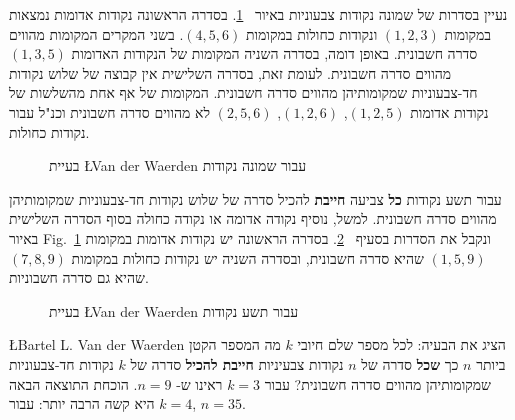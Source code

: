 נעיין בסדרות של שמונה נקודות צבעוניות באיור%
~\ref{f.vdw1}.
בסדרה הראשונה נקודות אדומות נמצאות במקומות
$(1,2,3)$
ונקודות כחולות במקומות
$(4,5,6)$.
בשני המקרים המקומות מהווים סדרה חשבונית. באופן דומה, בסדרה השניה המקומות של הנקודות האדומות
$(1,3,5)$
מהווים סדרה חשבונית. לעומת זאת, בסדרה השלישית אין קבוצה של שלוש נקודות חד-צבעוניות שמקומותיהן מהווים סדרה חשבונית. המקומות של אף אחת מהשלשות של נקודות אדומות 
$(1,2,5)$, $(1,2,6)$, $(2,5,6)$
לא מהווים סדרה חשבונית וכנ"ל עבור נקודות כחולות.
\begin{figure}[htb]
\begin{center}
\end{center}
\caption{בעיית \L{Van der Waerden} עבור שמונה נקודות}\label{f.vdw1}
\end{figure}

עבור תשע נקודות
\textbf{כל}
צביעה
\textbf{חייבת}
להכיל סדרה של שלוש נקודות חד-צבעוניות שמקומותיהן מהווים סדרה חשבונית. למשל, נוסיף נקודה אדומה או נקודה כחולה בסוף הסדרה השלישית באיור%
Fig.~\ref{f.vdw1}
ונקבל את הסדרות בסעיף%
~\ref{f.vdw2}.
בסדרה הראשונה יש נקודות אדומות במקומות
$(1,5,9)$
שהיא סדרה חשבונית, ובסדרה השניה יש נקודות כחולות במקומות 
$(7,8,9)$
שהיא גם סדרה חשבוניות.
\begin{figure}[htb]
\begin{center}
\end{center}
\caption{בעיית \L{Van der Waerden} עבור תשע נקודות}\label{f.vdw2}
\end{figure}

\L{Bartel L. Van der Waerden}
הציג את הבעיה:
לכל מספר שלם חיובי
$k$
מה המספר הקטן ביותר 
$n$
כך 
\textbf{שכל}
סדרה של 
$n$
נקודות צבעיניות
\textbf{חייבת להכיל}
סדרה של
$k$
נקודות חד-צבעוניות שמקומותיהן מהווים סדרה חשבונית? עבור
$k=3$
ראינו ש-%
$n=9$.
הוכחת התוצאה הבאה היא קשה הרבה יותר: עבור
$k=4$, $n=35$.

